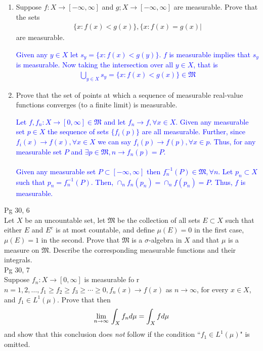 \documentclass[10pt,a4paper]{report}
\newcommand{\BLUE}[1]{\textcolor{blue}{#1}}
\begin{document}
\begin{enumerate}[label=(\alph*)]
	\item Suppose $f: X \to [-\infty, \infty]$ and $g; X \to [-\infty,\infty ]$ are measurable.  Prove that the sets 
	\begin{align*}
		\{x:f(x) < g(x)\}, \{x:f(x)=g(x)|
	\end{align*}are measurable.
	
	\BLUE{Given any $y \in X$ let $s_y = \{x: f(x) < g(y)\}$.  $f$ is measurable implies that $s_y$ is measurable.  Now taking the intersection over all $y \in X$, that is 
	\begin{align*}
		\bigcup_{y\in X} s_y = \{x:f(x) < g(x)\} \in \mathfrak{M} 
	\end{align*}
	}
	
	\item Prove that the set of points at which a sequence of measurable real-value functions converges (to a finite limit) is measurable.
	
	\BLUE{Let $f, f_n : X \to [0, \infty] \in \mathfrak{M}$ and let $f_n \to f, \forall x \in X$.  Given any measurable set $p\in X$ the sequence of sets $\{ f_i(p) \}$ are all measurable. Further, since $f_i(x) \to f(x), \forall x\in X$ we can say $f_i(p) \to f(p),\forall x \in p$.  Thus, for any measurable set $P$ and $\exists p \in \mathfrak{M}, n \to f_n(p)=P$.\\
	\\
	Given any measurable set $P \subset [-\infty, \infty]$ then $f_n^{-1}(P) \in \mathfrak{M},\forall n$.  Let $p_n \subset X$ such that $p_n = f_n^{-1}(P)$.  Then, $\cap_n f_n(p_n) = \cap_n f(p_n) = P$.  Thus, $f$ is measurable.
	}
	
\end{enumerate}

\HLINE
\noindent Pg 30, 6\\

Let $X$ be an uncountable set, let $\mathfrak{M}$ be the collection of all sets $E\subset X$ such that either $E$ and $E^c$ is at most countable, and define $\mu(E)=0$ in the first case, $\mu(E)=1$ in the second.  Prove that $\mathfrak{M}$ is a $\sigma$-algebra in $X$ and that $\mu$ is a measure on $\mathfrak{M}$.  Describe the corresponding measurable functions and their integrals.\\

\HLINE
\noindent Pg 30, 7\\

Suppose $f_n: X \to [0,\infty]$ is measurable fo r$n=1,2,\dots, f_1 \ge f_2\ge
f_3 \ge \cdots \ge 0, f_n(x)\to f(x)$ as $n\to \infty$, for every $x \in X$, and $f_1 \in L^1(\mu)$.  Prove that then
\begin{align*}
	\underset{n \to \infty}\lim\, \int_X f_n d\mu = \int_X f d \mu
\end{align*}and show that this conclusion does \textit{not} follow if the condition ``$f_1 \in L^1(\mu)$" is omitted.
\end{document}

